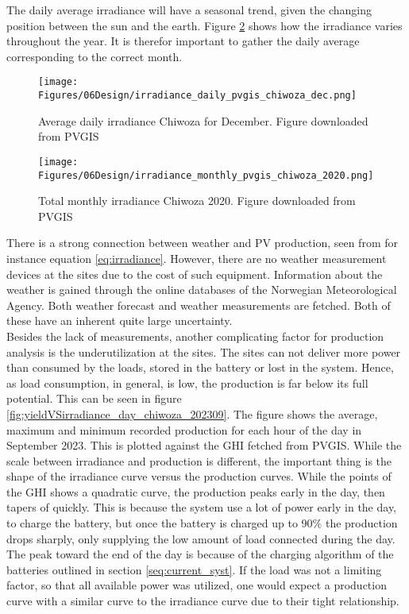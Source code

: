 The daily average irradiance will have a seasonal trend, given the changing position between the sun and the earth. Figure \ref{fig:irradiance_monthly_pvgis_chiwoza_2020} shows how the irradiance varies throughout the year. It is therefor important to gather the daily average corresponding to the correct month.

\begin{figure}
    \centering
    \texttt{[image: Figures/06Design/irradiance\_daily\_pvgis\_chiwoza\_dec.png]}
    \caption[Daily irradiance Chiwoza]{Average daily irradiance Chiwoza for December. Figure downloaded from PVGIS\cite{pvgis}}
    \label{fig:irradiance_daily_pvgis_chiwoza_dec}
\end{figure}

\begin{figure}
    \centering
    \texttt{[image: Figures/06Design/irradiance\_monthly\_pvgis\_chiwoza\_2020.png]}
    \caption[Monthly irradiance Chiwoza 2020]{Total monthly irradiance Chiwoza 2020. Figure downloaded from PVGIS\cite{pvgis}}
    \label{fig:irradiance_monthly_pvgis_chiwoza_2020}
\end{figure}

There is a strong connection between weather and PV production, seen from for instance equation \ref{eq:irradiance}. However, there are no weather measurement devices at the sites due to the cost of such equipment. Information about the weather is gained through the online databases of the Norwegian Meteorological Agency. Both weather forecast and weather measurements are fetched. Both of these have an inherent quite large uncertainty.\\

Besides the lack of measurements, another complicating factor for production analysis is the underutilization at the sites. The sites can not deliver more power than consumed by the loads, stored in the battery or lost in the system. Hence, as load consumption, in general, is low, the production is far below its full potential. This can be seen in figure \ref{fig:yieldVSirradiance_day_chiwoza_202309}. The figure shows the average, maximum and minimum recorded production for each hour of the day in September 2023. This is plotted against the GHI fetched from PVGIS\cite{pvgis}. While the scale between irradiance and production is different, the important thing is the shape of the irradiance curve versus the production curves. While the points of the GHI shows a quadratic curve, the production peaks early in the day, then tapers of quickly. This is because the system use a lot of power early in the day, to charge the battery, but once the battery is charged up to 90\% the production drops sharply, only supplying the low amount of load connected during the day. The peak toward the end of the day is because of the charging algorithm of the batteries outlined in section \ref{seq:current_syst}. If the load was not a limiting factor, so that all available power was utilized, one would expect a production curve with a similar curve to the irradiance curve due to their tight relationship.

